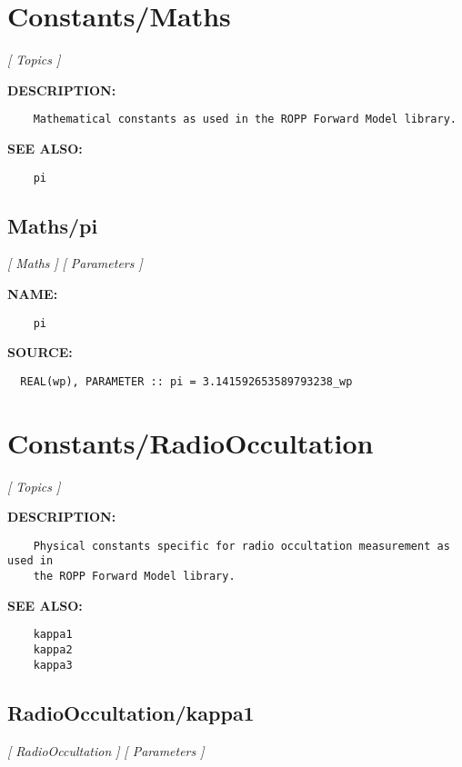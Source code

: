 \section{Constants/Maths}
\textsl{[ Topics ]}

\label{ch:robo24}
\label{ch:Constants_Maths}
\textbf{DESCRIPTION:}\hspace{0.08in}\begin{Verbatim}
    Mathematical constants as used in the ROPP Forward Model library. 
\end{Verbatim}
\textbf{SEE ALSO:}\hspace{0.08in}\begin{Verbatim}
    pi
\end{Verbatim}
\subsection{Maths/pi}
\textsl{[ Maths ]}
\textsl{[ Parameters ]}

\label{ch:robo55}
\label{ch:Maths_pi}
\textbf{NAME:}\hspace{0.08in}\begin{Verbatim}
    pi  
\end{Verbatim}
\textbf{SOURCE:}\hspace{0.08in}\begin{Verbatim}
  REAL(wp), PARAMETER :: pi = 3.141592653589793238_wp   
\end{Verbatim}
\section{Constants/RadioOccultation}
\textsl{[ Topics ]}

\label{ch:robo25}
\label{ch:Constants_RadioOccultation}
\textbf{DESCRIPTION:}\hspace{0.08in}\begin{Verbatim}
    Physical constants specific for radio occultation measurement as used in
    the ROPP Forward Model library.
\end{Verbatim}
\textbf{SEE ALSO:}\hspace{0.08in}\begin{Verbatim}
    kappa1
    kappa2
    kappa3
\end{Verbatim}
\subsection{RadioOccultation/kappa1}
\textsl{[ RadioOccultation ]}
\textsl{[ Parameters ]}

